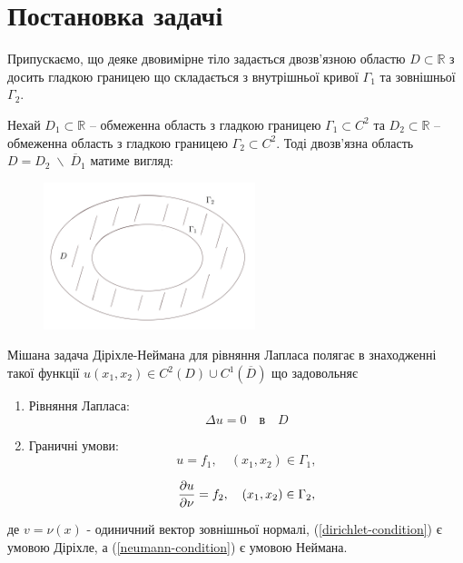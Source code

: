 \documentclass[14pt,a4paper]{extarticle}
\newcounter{e}
\begin{document}
 \thispagestyle{empty}
 \section{Постановка задачі}
		
	Припускаємо, що деяке двовимірне тіло задається двозв'язною областю $D \subset \mathbb{R}$ з досить гладкою границею що складається з внутрішньої кривої $\Gamma_1$ та зовнішньої $\Gamma_2$. 
	
	Нехай $D_1 \subset \mathbb{R}$ – обмеженна область з гладкою границею $\Gamma_1 \subset C^2$ та $D_2 \subset \mathbb{R}$ – обмеженна область з гладкою границею $\Gamma_2 \subset C^2$. Тоді двозв'язна область $D = D_2 \; \backslash \; \overline{D}_1$ матиме вигляд:

	\begin{figure}[h]
		\centering
		\includegraphics[width=0.55\textwidth]{resources/doubly-connected-region}
		\caption{}
		\label{fig:double-connected-region}
	\end{figure}

	Мішана задача Діріхле-Неймана для рівняння Лапласа полягає в знаходженні такої функції $u(x_1, x_2) \in C^{2}(D) \cup  C^{1}(\overline{D})$ що задовольняє

	\begin{enumerate}
		\item
		Рівняння Лапласа: 
		\begin{equation}
			\label{laplace-eq}
			\Delta{u} = 0 \quad \text{в} \quad D
		\end{equation}

		\item
		Граничні умови:
		\begin{equation}
			\label{dirichlet-condition}
			u = f_1, \quad (x_1, x_2) \in \Gamma_1,
		\end{equation}
	
		\begin{equation}
			\label{neumann-condition}
			\pdv{u}{\nu} = f_2, \quad (x_1, x_2) \in \Gamma_2,		
		\end{equation}

	\end{enumerate}
	де $v = \nu(x)$ - одиничний вектор зовнішньої нормалі, (\ref{dirichlet-condition}) є умовою Діріхле, а (\ref{neumann-condition}) є умовою Неймана.
	
\end{document}
